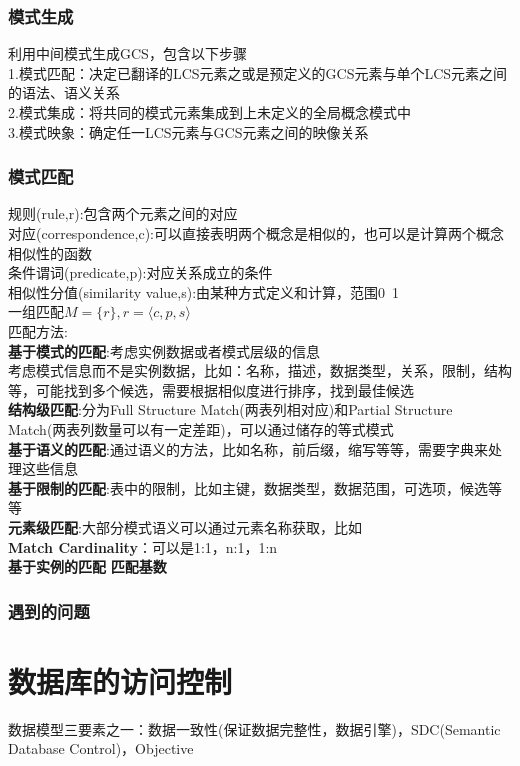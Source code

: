 \documentclass{article}
\begin{document}
\begin{CJK}{UTF8}{gbsn}
	\subsubsection*{模式生成}
	利用中间模式生成GCS，包含以下步骤\\
	1.模式匹配：决定已翻译的LCS元素之或是预定义的GCS元素与单个LCS元素之间的语法、语义关系\\
	2.模式集成：将共同的模式元素集成到上未定义的全局概念模式中\\
	3.模式映象：确定任一LCS元素与GCS元素之间的映像关系\\
	\subsubsection*{模式匹配}
	规则(rule,r):包含两个元素之间的对应\\
	对应(correspondence,c):可以直接表明两个概念是相似的，也可以是计算两个概念相似性的函数\\
	条件谓词(predicate,p):对应关系成立的条件\\
	相似性分值(similarity value,s):由某种方式定义和计算，范围0~1\\
	一组匹配$M=\{r\},r=\langle c,p,s \rangle$\\
	匹配方法:\\
	\textbf{基于模式的匹配}:考虑实例数据或者模式层级的信息\\
	考虑模式信息而不是实例数据，比如：名称，描述，数据类型，关系，限制，结构等，可能找到多个候选，需要根据相似度进行排序，找到最佳候选\\
	\textbf{结构级匹配}:分为Full Structure Match(两表列相对应)和Partial Structure Match(两表列数量可以有一定差距)，可以通过储存的等式模式\\
	\textbf{基于语义的匹配}:通过语义的方法，比如名称，前后缀，缩写等等，需要字典来处理这些信息\\
	\textbf{基于限制的匹配}:表中的限制，比如主键，数据类型，数据范围，可选项，候选等等\\
	\textbf{元素级匹配}:大部分模式语义可以通过元素名称获取，比如\\
	\textbf{Match Cardinality}：可以是1:1，n:1，1:n\\
	\textbf{基于实例的匹配}
	\textbf{匹配基数}
	\subsubsection*{遇到的问题}
	
	
	\section*{数据库的访问控制}
	数据模型三要素之一：数据一致性(保证数据完整性，数据引擎)，SDC(Semantic Database Control)，Objective\\

\end{CJK}
\end{document}
